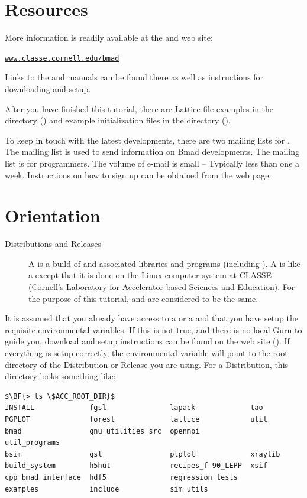 \documentclass{hitec}
\newcommand{\Section}[1]{\section{#1}\vspace*{-1ex}}
\newenvironment{display}
  {\vspace*{-1.5ex} \begin{alltt}}
  {\end{alltt} \vspace*{-1.0ex}}
\begin{document}
\newpage

\Section{Resources}
\label{s:resources}

More information is readily available at the \bmad and \tao web site:
\begin{display}
  \url{www.classe.cornell.edu/bmad}
\end{display}
Links to the \bmad and \tao manuals can be found there as well as instructions for
downloading and setup.

After you have finished this tutorial, there are Lattice file examples in the 
directory () and example \tao initialization files in the 
directory ().

To keep in touch with the latest \bmad developments, there are two mailing lists for
\bmad.  The  mailing list is used to send information on Bmad developments.  The
 mailing list is for programmers. The volume of e-mail is small -- Typically
less than one a week. Instructions on how to sign up can be obtained from the \bmad web
page.

\Section{Orientation}
\label{s:orientation}

  \begin{description}
  \item[Distributions and Releases] \Newline
A  is a build of \bmad and associated libraries and programs (including \tao).  A
 is like a  except that it is done on the Linux computer system at
CLASSE (Cornell's Laboratory for Accelerator-based Sciences and Education). For the purpose of this
tutorial,  and  are considered to be the same.
  \end{description}

It is assumed that you already have access to a  or a  and that
you have setup the requisite environmental variables. If this is not true, and there is no
local \bmad Guru to guide you, download and setup instructions can be found on the \bmad web
site (). If everything is setup correctly, the environmental variable
 will point to the root directory of the Distribution or Release you are
using. For a Distribution, this directory looks something like:
\begin{lstlisting}[mathescape]
$\BF{> ls \$ACC_ROOT_DIR}$
INSTALL             fgsl               lapack             tao
PGPLOT              forest             lattice            util
bmad                gnu_utilities_src  openmpi            util_programs
bsim                gsl                plplot             xraylib
build_system        h5hut              recipes_f-90_LEPP  xsif
cpp_bmad_interface  hdf5               regression_tests
examples            include            sim_utils
\end{lstlisting}
\end{document}
